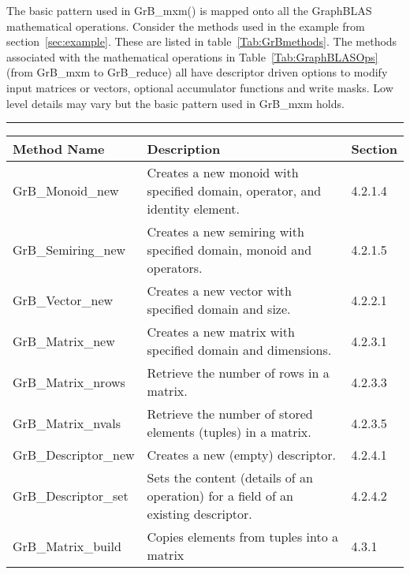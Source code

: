 The basic pattern used in {\sf GrB\_mxm()} is mapped onto all the GraphBLAS mathematical operations.  
Consider the methods used in the example from section~\ref{sec:example}.  These are listed in 
table~\ref{Tab:GrBmethods}.   The methods associated with the mathematical operations in 
Table~\ref{Tab:GraphBLASOps} (from {\sf GrB\_mxm} to {\sf GrB\_reduce})
all have descriptor driven options to modify input matrices or vectors, optional accumulator 
functions and write masks.   Low level details may vary but the basic pattern used
in {\sf GrB\_mxm} holds.
 
\begin{table*}[h]
\hrule
\begin{center}
\caption{The following methods are used in the Betweenness Centrality example in section~\ref{sec:example}.  The third 
column in this table refers to the section in the GraphBLAS C specification 1.0 where the method is more fully defined.}
\label{Tab:GrBmethods}
\begin{tabular}{lll}
Method Name                     & Description  & Section \\
\hline
	{\sf GrB\_Monoid\_new}      & Creates a new monoid with specified domain, operator, and identity element.       & 4.2.1.4 \\
	{\sf GrB\_Semiring\_new}    & Creates a new semiring with specified domain, monoid and operators.               & 4.2.1.5 \\
	{\sf GrB\_Vector\_new}      & Creates a new vector with specified domain and size.                              & 4.2.2.1 \\
	{\sf GrB\_Matrix\_new}      & Creates a new matrix with specified domain and dimensions.                        & 4.2.3.1 \\
	{\sf GrB\_Matrix\_nrows}    & Retrieve the number of rows in a matrix.                                          & 4.2.3.3 \\
	{\sf GrB\_Matrix\_nvals}    & Retrieve the number of stored elements (tuples) in a matrix.                      & 4.2.3.5 \\
	{\sf GrB\_Descriptor\_new}  & Creates a new (empty) descriptor.                                                 & 4.2.4.1 \\
	{\sf GrB\_Descriptor\_set}  & Sets the content (details of an operation) for a field of an existing descriptor. & 4.2.4.2 \\
	{\sf GrB\_Matrix\_build}    & Copies elements from tuples into a matrix                                         & 4.3.1 \\

\end{tabular}
\end{center}
\end{table*}
